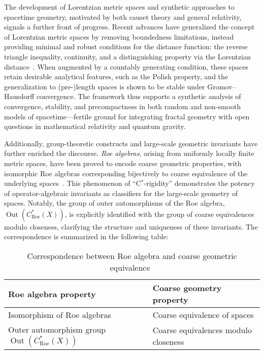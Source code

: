 \documentclass[sigconf]{acmart}
\begin{document}
The development of Lorentzian metric spaces and synthetic approaches to spacetime geometry, motivated by both causet theory and general relativity, signals a further front of progress. Recent advances have generalized the concept of Lorentzian metric spaces by removing boundedness limitations, instead providing minimal and robust conditions for the distance function: the reverse triangle inequality, continuity, and a distinguishing property via the Lorentzian distance~\cite{ref51}. When augmented by a countably generating condition, these spaces retain desirable analytical features, such as the Polish property, and the generalization to (pre-)length spaces is shown to be stable under Gromov--Hausdorff convergence. The framework thus supports a synthetic analysis of convergence, stability, and precompactness in both random and non-smooth models of spacetime---fertile ground for integrating fractal geometry with open questions in mathematical relativity and quantum gravity.

Additionally, group-theoretic constructs and large-scale geometric invariants have further enriched the discourse. \emph{Roe algebras}, arising from uniformly locally finite metric spaces, have been proved to encode coarse geometric properties, with isomorphic Roe algebras corresponding bijectively to coarse equivalence of the underlying spaces~\cite{ref52}. This phenomenon of ``C$^*$-rigidity'' demonstrates the potency of operator-algebraic invariants as classifiers for the large-scale geometry of spaces. Notably, the group of outer automorphisms of the Roe algebra, $\operatorname{Out}(C^*_{\mathrm{Roe}}(X))$, is explicitly identified with the group of coarse equivalences modulo closeness, clarifying the structure and uniqueness of these invariants. The correspondence is summarized in the following table:

\begin{table*}[htbp]
\centering
\caption{Correspondence between Roe algebra and coarse geometric equivalence~\cite{ref52}}
\label{tab:roe-coarse}
\begin{adjustbox}{max width=\textwidth}
\begin{tabular}{@{}ll@{}}
\toprule
Roe algebra property & Coarse geometry property \\
\midrule
Isomorphism of Roe algebras & Coarse equivalence of spaces \\
Outer automorphism group $\operatorname{Out}(C^*_{\mathrm{Roe}}(X))$ & Coarse equivalences modulo closeness \\
\bottomrule
\end{tabular}
\end{adjustbox}
\end{table*}
\end{document}
